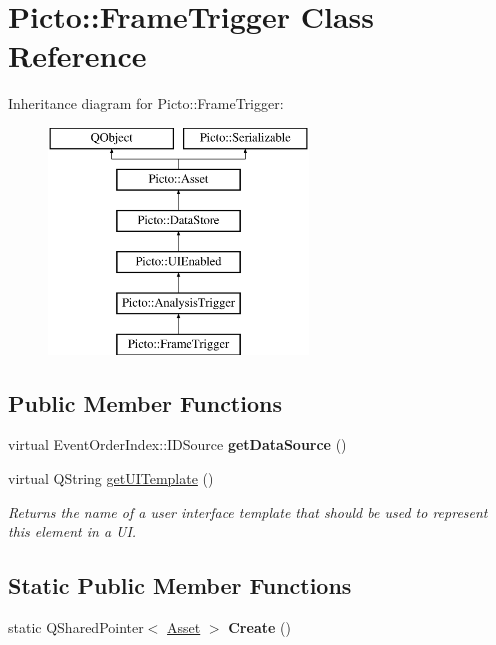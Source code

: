 \hypertarget{class_picto_1_1_frame_trigger}{\section{Picto\-:\-:Frame\-Trigger Class Reference}
\label{class_picto_1_1_frame_trigger}
}
Inheritance diagram for Picto\-:\-:Frame\-Trigger\-:\begin{figure}[H]
\begin{center}
\leavevmode
\includegraphics[height=6.000000cm]{class_picto_1_1_frame_trigger}
\end{center}
\end{figure}
\subsection*{Public Member Functions}
\begin{DoxyCompactItemize}
\item 
\hypertarget{class_picto_1_1_frame_trigger_a6b0c266e03024d6a93f9ac28a4652485}{virtual Event\-Order\-Index\-::\-I\-D\-Source {\bfseries get\-Data\-Source} ()}\label{class_picto_1_1_frame_trigger_a6b0c266e03024d6a93f9ac28a4652485}

\item 
\hypertarget{class_picto_1_1_frame_trigger_a4444e24b9f3911589c6a13db451d0e2a}{virtual Q\-String \hyperlink{class_picto_1_1_frame_trigger_a4444e24b9f3911589c6a13db451d0e2a}{get\-U\-I\-Template} ()}\label{class_picto_1_1_frame_trigger_a4444e24b9f3911589c6a13db451d0e2a}

\begin{DoxyCompactList}\small\item\em Returns the name of a user interface template that should be used to represent this element in a U\-I. \end{DoxyCompactList}\end{DoxyCompactItemize}
\subsection*{Static Public Member Functions}
\begin{DoxyCompactItemize}
\item 
\hypertarget{class_picto_1_1_frame_trigger_ab89e43b96d9f09627c8c69b2c207fd11}{static Q\-Shared\-Pointer$<$ \hyperlink{class_picto_1_1_asset}{Asset} $>$ {\bfseries Create} ()}\label{class_picto_1_1_frame_trigger_ab89e43b96d9f09627c8c69b2c207fd11}

\end{DoxyCompactItemize}
